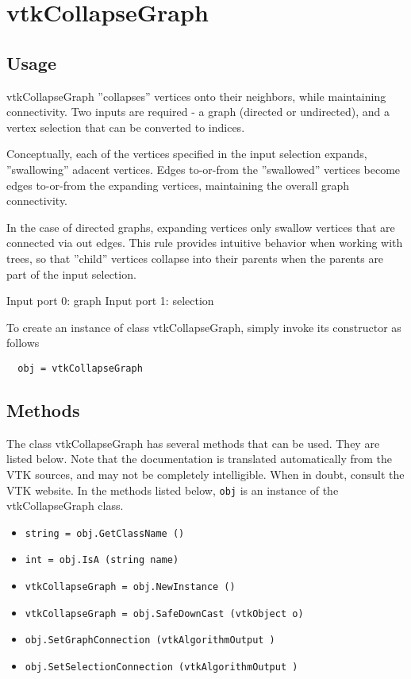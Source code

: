 \section{vtkCollapseGraph}

\subsection{Usage}


 vtkCollapseGraph ''collapses'' vertices onto their neighbors, while maintaining
 connectivity.  Two inputs are required - a graph (directed or undirected),
 and a vertex selection that can be converted to indices.

 Conceptually, each of the vertices specified in the input selection
 expands, ''swallowing'' adacent vertices.  Edges to-or-from the ''swallowed''
 vertices become edges to-or-from the expanding vertices, maintaining the
 overall graph connectivity.

 In the case of directed graphs, expanding vertices only swallow vertices that
 are connected via out edges.  This rule provides intuitive behavior when
 working with trees, so that ''child'' vertices collapse into their parents
 when the parents are part of the input selection.

 Input port 0: graph
 Input port 1: selection

To create an instance of class vtkCollapseGraph, simply
invoke its constructor as follows
\begin{verbatim}
  obj = vtkCollapseGraph
\end{verbatim}
\subsection{Methods}

The class vtkCollapseGraph has several methods that can be used.
  They are listed below.
Note that the documentation is translated automatically from the VTK sources,
and may not be completely intelligible.  When in doubt, consult the VTK website.
In the methods listed below, \verb|obj| is an instance of the vtkCollapseGraph class.
\begin{itemize}
\item  \verb|string = obj.GetClassName ()|

\item  \verb|int = obj.IsA (string name)|

\item  \verb|vtkCollapseGraph = obj.NewInstance ()|

\item  \verb|vtkCollapseGraph = obj.SafeDownCast (vtkObject o)|

\item  \verb|obj.SetGraphConnection (vtkAlgorithmOutput )|

\item  \verb|obj.SetSelectionConnection (vtkAlgorithmOutput )|

\end{itemize}
